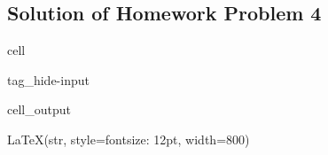 \documentclass[letterpaper,10pt,english]{jupyterBook}
\begin{document}
\subsection{Solution of Homework Problem 4}
\label{\detokenize{content/tutorials/T6/tutorial_06:solution-of-homework-problem-4}}
\begin{sphinxuseclass}{cell}
\begin{sphinxuseclass}{tag_hide-input}\begin{sphinxVerbatimOutput}

\begin{sphinxuseclass}{cell_output}
\begin{sphinxVerbatim}[commandchars=\\\{\}]
LaTeX(str, style=\PYGZob{}\PYGZsq{}font\PYGZhy{}size\PYGZsq{}: \PYGZsq{}12pt\PYGZsq{}\PYGZcb{}, width=800)
\end{sphinxVerbatim}

\end{sphinxuseclass}\end{sphinxVerbatimOutput}

\end{sphinxuseclass}
\end{sphinxuseclass}
\end{document}
